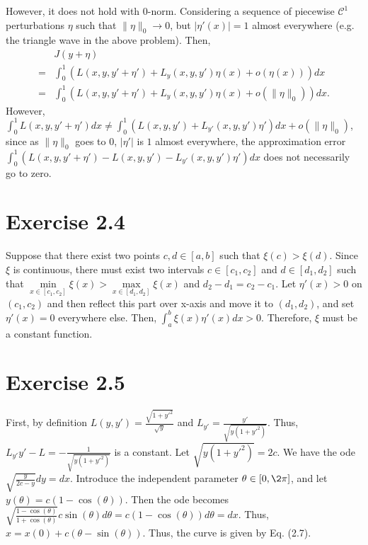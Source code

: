 \documentclass[11pt]{report}
\begin{document}
\noindent However, it does not hold with $0$-norm. Considering a sequence of piecewise $\mathcal{C}^1$ perturbations $\eta$ such that $\|\eta\|_0 \to 0$, but $|\eta'(x)| = 1$ almost everywhere (e.g. the triangle wave in the above problem). Then,
\begin{align*}
&J(y+\eta) \\= &\int_{0}^{1} \left(L(x,y,y'+\eta') + L_y(x,y,y')\eta(x) + o(\eta(x))\right) dx \\= &\int_{0}^{1} \left(L(x,y,y'+\eta') + L_y(x,y,y')\eta(x) + o(\|\eta\|_0)\right) dx.
\end{align*}
However, $\int_0^1 L(x,y,y'+\eta') dx \neq \int_0^1 \left(L(x,y,y') + L_{y'}(x,y,y')\eta'\right) dx + o(\|\eta\|_0)$, since as $\|\eta\|_0$ goes to $0$, $|\eta'|$ is $1$ almost everywhere, the approximation error $\int_0^1 \left(L(x,y,y'+\eta') - L(x,y,y') - L_{y'}(x,y,y')\eta'\right) dx$ does not necessarily go to zero.

\section*{Exercise 2.4}
Suppose that there exist two points $c,d \in [a, b]$ such that $\xi(c) > \xi(d)$. Since $\xi$ is continuous, there must exist two intervals $c \in [c_1, c_2]$ and $d \in [d_1, d_2]$ such that $\min\limits_{x \in [c_1, c_2]} \xi(x) > \max\limits_{x \in [d_1, d_2]} \xi(x)$ and $d_2 - d_1 = c_2 - c_1$. Let $\eta'(x) > 0$ on $(c_1, c_2)$ and then reflect this part over x-axis and move it to $(d_1, d_2)$, and set $\eta'(x) = 0$ everywhere else. Then, $\int_a^b \xi(x)\eta'(x) dx > 0$. Therefore, $\xi$ must be a constant function.

\section*{Exercise 2.5}
First, by definition $L(y,y') = \frac{\sqrt{1+y'^2}}{\sqrt{y}}$ and $L_{y'} = \frac{y'}{\sqrt{y(1+y'^2)}}$. Thus, $L_{y'}y' - L = -\frac{1}{\sqrt{y(1+y'^2)}}$ is a constant. Let $\sqrt{y(1+y'^2)} = 2c$. We have the ode $\sqrt{\frac{y}{2c-y}}dy = dx$. Introduce the independent parameter $\theta \in [0, \2\pi]$, and let $y(\theta) = c(1-\cos(\theta))$. Then the ode becomes $\sqrt{\frac{1-\cos(\theta)}{1+\cos(\theta)}}c\sin(\theta)d\theta = c(1-\cos(\theta))d\theta = dx$. Thus, $x = x(0) + c(\theta - \sin(\theta))$. Thus, the curve is given by Eq. (2.7).

\end{document}
